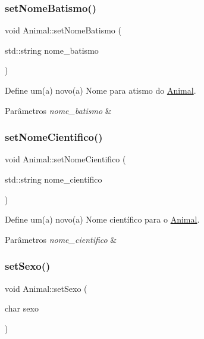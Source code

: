 \subsubsection{\texorpdfstring{set\+Nome\+Batismo()}{setNomeBatismo()}}
{\footnotesize\ttfamily void Animal\+::set\+Nome\+Batismo (\begin{DoxyParamCaption}\item[{std\+::string}]{nome\+\_\+batismo }\end{DoxyParamCaption})}



Define um(a) novo(a) Nome para atismo do \hyperlink{classAnimal}{Animal}. 


\begin{DoxyParams}{Parâmetros}
{\em nome\+\_\+batismo} & \\
\hline
\end{DoxyParams}
\mbox{\label{classAnimal_ad2e0ffb0dcb6b58467010d9f11488899}} 
\subsubsection{\texorpdfstring{set\+Nome\+Cientifico()}{setNomeCientifico()}}
{\footnotesize\ttfamily void Animal\+::set\+Nome\+Cientifico (\begin{DoxyParamCaption}\item[{std\+::string}]{nome\+\_\+cientifico }\end{DoxyParamCaption})}



Define um(a) novo(a) Nome científico para o \hyperlink{classAnimal}{Animal}. 


\begin{DoxyParams}{Parâmetros}
{\em nome\+\_\+cientifico} & \\
\hline
\end{DoxyParams}
\mbox{\label{classAnimal_aab32d5ad6689a4e19cfd43a303c939af}} 
\subsubsection{\texorpdfstring{set\+Sexo()}{setSexo()}}
{\footnotesize\ttfamily void Animal\+::set\+Sexo (\begin{DoxyParamCaption}\item[{char}]{sexo }\end{DoxyParamCaption})}



